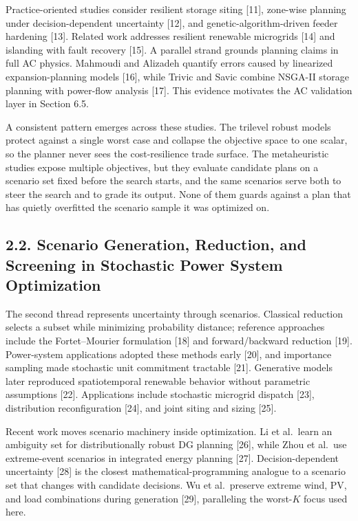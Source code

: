 \documentclass[
  10pt,
  a4paper,
]{article}
\begin{document}
Practice-oriented studies consider resilient storage siting {[}11{]},
zone-wise planning under decision-dependent uncertainty {[}12{]}, and
genetic-algorithm-driven feeder hardening {[}13{]}. Related work
addresses resilient renewable microgrids {[}14{]} and islanding with
fault recovery {[}15{]}. A parallel strand grounds planning claims in
full AC physics. Mahmoudi and Alizadeh quantify errors caused by
linearized expansion-planning models {[}16{]}, while Trivic and Savic
combine NSGA-II storage planning with power-flow analysis {[}17{]}. This
evidence motivates the AC validation layer in Section 6.5.

A consistent pattern emerges across these studies. The trilevel robust
models protect against a single worst case and collapse the objective
space to one scalar, so the planner never sees the cost-resilience trade
surface. The metaheuristic studies expose multiple objectives, but they
evaluate candidate plans on a scenario set fixed before the search
starts, and the same scenarios serve both to steer the search and to
grade its output. None of them guards against a plan that has quietly
overfitted the scenario sample it was optimized on.

\subsection{2.2. Scenario Generation, Reduction, and Screening in
Stochastic Power System
Optimization}\label{scenario-generation-reduction-and-screening-in-stochastic-power-system-optimization}

The second thread represents uncertainty through scenarios. Classical
reduction selects a subset while minimizing probability distance;
reference approaches include the Fortet--Mourier formulation {[}18{]}
and forward/backward reduction {[}19{]}. Power-system applications
adopted these methods early {[}20{]}, and importance sampling made
stochastic unit commitment tractable {[}21{]}. Generative models later
reproduced spatiotemporal renewable behavior without parametric
assumptions {[}22{]}. Applications include stochastic microgrid dispatch
{[}23{]}, distribution reconfiguration {[}24{]}, and joint siting and
sizing {[}25{]}.

Recent work moves scenario machinery inside optimization. Li et
al.~learn an ambiguity set for distributionally robust DG planning
{[}26{]}, while Zhou et al.~use extreme-event scenarios in integrated
energy planning {[}27{]}. Decision-dependent uncertainty {[}28{]} is the
closest mathematical-programming analogue to a scenario set that changes
with candidate decisions. Wu et al.~preserve extreme wind, PV, and load
combinations during generation {[}29{]}, paralleling the worst-\(K\)
focus used here.
\end{document}
